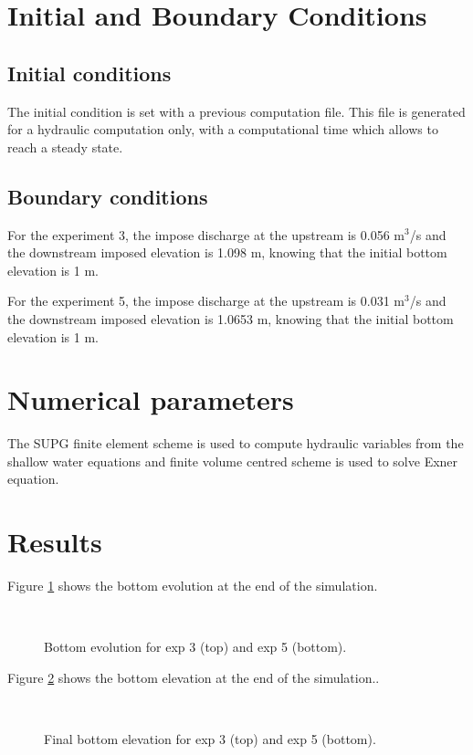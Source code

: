 \section{Initial and Boundary Conditions}

\subsection{Initial conditions}
%
The initial condition is set with a previous computation file. This file is generated for a hydraulic computation only, with a computational time which allows to reach a steady state.
%
\subsection{Boundary conditions}
%
For the experiment 3, the impose discharge at the upstream is 0.056 m$^3$/s and the downstream imposed elevation is 1.098 m, knowing that the initial bottom elevation is 1 m.

For the experiment 5, the impose discharge at the upstream is 0.031 m$^3$/s and the downstream imposed elevation is 1.0653 m, knowing that the initial bottom elevation is 1 m.
%
\section{Numerical parameters}
%
The SUPG finite element scheme is used to compute hydraulic variables from the shallow water equations and finite volume centred scheme is used to solve Exner equation.
%
\section{Results}
%
Figure \ref{guenter-t2d:fig:evol} shows the bottom evolution at the end of the simulation.

\begin{figure}[H]
 \centering
 \\
 \caption{Bottom evolution for exp 3 (top) and exp 5 (bottom).}
 \label{guenter-t2d:fig:evol}
\end{figure}

Figure \ref{guenter-t2d:fig:final} shows the bottom elevation at the end of the simulation..

\begin{figure}[H]
 \centering
 \\
 \caption{Final bottom elevation for exp 3 (top) and exp 5 (bottom).}
 \label{guenter-t2d:fig:final}
\end{figure}

